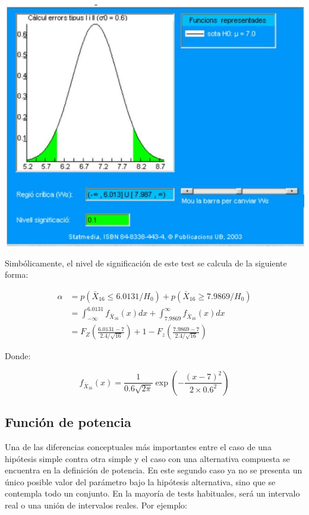 \documentclass[
]{article}
\begin{document}
\begin{center}\includegraphics[width=0.9\linewidth]{images/cap9-RCHipotesisComposta} \end{center}

Simbólicamente, el nivel de significación de este test se calcula de la siguiente forma:

\[
\begin{aligned}
\alpha & =p\left(\bar{X}_{16} \leq 6.0131 / H_{0}\right)+p\left(\bar{X}_{16} \geq 7.9869 / H_{0}\right) \\
& =\int_{-\infty}^{6.0131} f_{\bar{X}_{16}}(x) d x+\int_{7.9869}^{\infty} f_{\bar{X}_{16}}(x) d x \\
& =F_{Z}\left(\frac{6.0131-7}{2.4 / \sqrt{16}}\right)+1-F_{z}\left(\frac{7.9869-7}{2.4 / \sqrt{16}}\right)
\end{aligned}
\]

Donde:

\[
f_{\bar{X}_{16}}(x)=\frac{1}{0.6 \sqrt{2 \pi}} \exp \left(-\frac{(x-7)^{2}}{2 \times 0.6^{2}}\right)
\]

\subsection{Función de potencia}\label{funciuxf3n-de-potencia}

Una de las diferencias conceptuales más importantes entre el caso de una hipótesis simple contra otra simple y el caso con una alternativa compuesta se encuentra en la definición de potencia. En este segundo caso ya no se presenta un único posible valor del parámetro bajo la hipótesis alternativa, sino que se contempla todo un conjunto. En la mayoría de tests habituales, será un intervalo real o una unión de intervalos reales. Por ejemplo:
\end{document}
